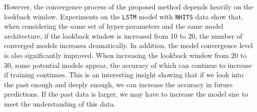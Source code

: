 \documentclass[aps,prb,groupedaddress,twocolumn,showpacs,dvipdfmx,superscriptaddress,pdftex]{revtex4-2}
\begin{document}
However, the convergence process of the proposed method depends heavily on the lookback window. Experiments on the \verb|LSTM| model with \verb|NHITS| data show that, when considering the same set of hyper-parameters and the same model architecture, if the lookback window is increased from 10 to 20, the number of converged models increases dramatically. In addition, the model convergence level is also significantly improved. When increasing the lookback window from 20 to 30, some potential models appear, the accuracy of which can continue to increase if training continues. This is an interesting insight showing that if we look into the past enough and deeply enough, we can increase the accuracy in future predictions. If the past data is larger, we may have to increase the model size to meet the understanding of this data.
\end{document}
